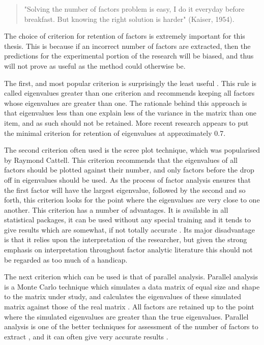 \begin{quotation}
  "Solving the number of factors problem is
     easy, I do it everyday before breakfast.  But knowing the right
     solution is harder" (Kaiser, 1954).
\end{quotation}

The choice of criterion for retention of factors is extremely important for this thesis. This is because if an incorrect number of factors are extracted, then the predictions for the experimental portion of the research will be biased, and thus will not prove as useful as the method could otherwise be. 

The first, and most popular criterion is surprisingly the least useful \cite{zwick1986comparison}. This rule is called eigenvalues greater than one criterion and recommends keeping all factors whose eigenvalues are greater than one. The rationale behind this approach is that eigenvalues less than one explain less of the variance in the matrix than one item, and as such should not be retained.  More recent research appears to put the minimal criterion for retention of eigenvalues at approximately 0.7. 

The second criterion often used is the scree plot technique, which was popularised by Raymond Cattell. This criterion recommends that the eigenvalues of all factors should be plotted against their number, and only factors before the drop off in eigenvalues should be used. As the process of factor analysis ensures that the first factor will have the largest eigenvalue, followed by the second and so forth, this criterion looks for the point where the eigenvalues are very close to one another.  This criterion has a number of advantages.  It is available in all statistical packages, it can be used without any special training and it tends to give results which are somewhat, if not totally accurate \cite{zwick1986comparison}.  Its major disadvantage is that it relies upon the interpretation of the researcher, but given the strong emphasis on interpretation throughout factor analytic literature this should not be regarded as too much of a handicap.

The next criterion which can be used is that of parallel analysis. Parallel analysis is a Monte Carlo  technique which simulates a data matrix of equal size and shape to the matrix under study, and calculates the eigenvalues of these simulated matrix against those of the real matrix \cite{horn1965rationale}. All factors are retained up to the point where the simulated eigenvalues are greater than the true eigenvalues.  Parallel analysis is one of the better techniques for assessment of the number of factors to extract , and it can often give very accurate results \cite{zwick1986comparison}.

